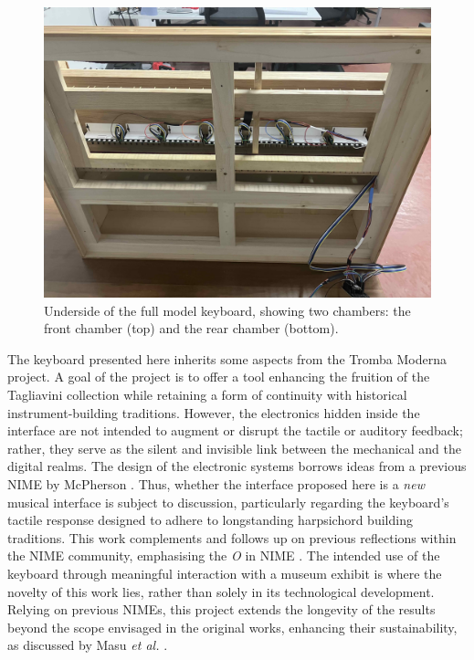 \begin{figure}[b]
  \centering
  \includegraphics[width=\linewidth]{src/images/49-key-bottom-sensors-no-keys.jpg} 
  \caption{Underside of the full model keyboard, showing two chambers: the front chamber (top) and the rear chamber (bottom).} 
  \Description{} 
  \label{fig:49-key-bottom}
\end{figure}

The keyboard presented here inherits some aspects from the Tromba Moderna project. A goal of the project is to offer a tool enhancing the fruition of the Tagliavini collection while retaining a form of continuity with historical instrument-building traditions. However, the electronics hidden inside the interface are not intended to augment or disrupt the tactile or auditory feedback; rather, they serve as the silent and invisible link between the mechanical and the digital realms. The design of the electronic systems borrows ideas from a previous NIME by McPherson \cite{McPherson2013}. Thus, whether the interface proposed here is a \emph{new} musical interface is subject to discussion, particularly regarding the keyboard's tactile response designed to adhere to longstanding harpsichord building traditions. This work complements and follows up on previous reflections within the NIME community, emphasising the \emph{O} in NIME \cite{Masu_NIME_2023}. The intended use of the keyboard through meaningful interaction with a museum exhibit is where the novelty of this work lies, rather than solely in its technological development. Relying on previous NIMEs, this project extends the longevity of the results beyond the scope envisaged in the original works, enhancing their sustainability, as discussed by Masu \emph{et al.} \cite{Masu_NIME_2023}.

